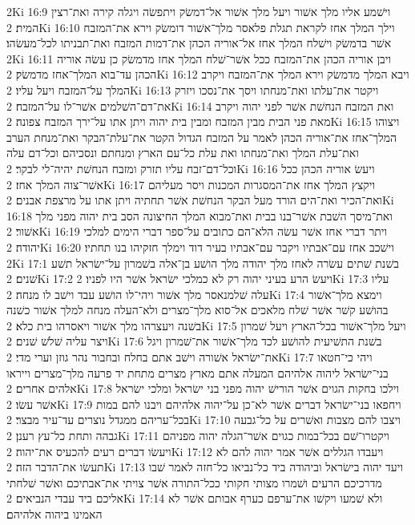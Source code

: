 2Ki 16:9  וישׁמע אליו מלך אשׁור ויעל מלך אשׁור אל־דמשׂק ויתפשׂה ויגלה קירה ואת־רצין המית׃
2Ki 16:10  וילך המלך אחז לקראת תגלת פלאסר מלך־אשׁור דומשׂק וירא את־המזבח אשׁר בדמשׂק וישׁלח המלך אחז אל־אוריה הכהן את־דמות המזבח ואת־תבניתו לכל־מעשׂהו׃
2Ki 16:11  ויבן אוריה הכהן את־המזבח ככל אשׁר־שׁלח המלך אחז מדמשׂק כן עשׂה אוריה הכהן עד־בוא המלך־אחז מדמשׂק׃
2Ki 16:12  ויבא המלך מדמשׂק וירא המלך את־המזבח ויקרב המלך על־המזבח ויעל עליו׃
2Ki 16:13  ויקטר את־עלתו ואת־מנחתו ויסך את־נסכו ויזרק את־דם־השׁלמים אשׁר־לו על־המזבח׃
2Ki 16:14  ואת המזבח הנחשׁת אשׁר לפני יהוה ויקרב מאת פני הבית מבין המזבח ומבין בית יהוה ויתן אתו על־ירך המזבח צפונה׃
2Ki 16:15  ויצוהו המלך־אחז את־אוריה הכהן לאמר על המזבח הגדול הקטר את־עלת־הבקר ואת־מנחת הערב ואת־עלת המלך ואת־מנחתו ואת עלת כל־עם הארץ ומנחתם ונסכיהם וכל־דם עלה וכל־דם־זבח עליו תזרק ומזבח הנחשׁת יהיה־לי לבקר׃
2Ki 16:16  ויעשׂ אוריה הכהן ככל אשׁר־צוה המלך אחז׃
2Ki 16:17  ויקצץ המלך אחז את־המסגרות המכנות ויסר מעליהם ואת־הכיר ואת־הים הורד מעל הבקר הנחשׁת אשׁר תחתיה ויתן אתו על מרצפת אבנים׃
2Ki 16:18  ואת־מיסך השׁבת אשׁר־בנו בבית ואת־מבוא המלך החיצונה הסב בית יהוה מפני מלך אשׁור׃
2Ki 16:19  ויתר דברי אחז אשׁר עשׂה הלא־הם כתובים על־ספר דברי הימים למלכי יהודה׃
2Ki 16:20  וישׁכב אחז עם־אבתיו ויקבר עם־אבתיו בעיר דוד וימלך חזקיהו בנו תחתיו׃
2Ki 17:1  בשׁנת שׁתים עשׂרה לאחז מלך יהודה מלך הושׁע בן־אלה בשׁמרון על־ישׂראל תשׁע שׁנים׃
2Ki 17:2  ויעשׂ הרע בעיני יהוה רק לא כמלכי ישׂראל אשׁר היו לפניו׃
2Ki 17:3  עליו עלה שׁלמנאסר מלך אשׁור ויהי־לו הושׁע עבד וישׁב לו מנחה׃
2Ki 17:4  וימצא מלך־אשׁור בהושׁע קשׁר אשׁר שׁלח מלאכים אל־סוא מלך־מצרים ולא־העלה מנחה למלך אשׁור כשׁנה בשׁנה ויעצרהו מלך אשׁור ויאסרהו בית כלא׃
2Ki 17:5  ויעל מלך־אשׁור בכל־הארץ ויעל שׁמרון ויצר עליה שׁלשׁ שׁנים׃
2Ki 17:6  בשׁנת התשׁיעית להושׁע לכד מלך־אשׁור את־שׁמרון ויגל את־ישׂראל אשׁורה וישׁב אתם בחלח ובחבור נהר גוזן וערי מדי׃
2Ki 17:7  ויהי כי־חטאו בני־ישׂראל ליהוה אלהיהם המעלה אתם מארץ מצרים מתחת יד פרעה מלך־מצרים וייראו אלהים אחרים׃
2Ki 17:8  וילכו בחקות הגוים אשׁר הורישׁ יהוה מפני בני ישׂראל ומלכי ישׂראל אשׁר עשׂו׃
2Ki 17:9  ויחפאו בני־ישׂראל דברים אשׁר לא־כן על־יהוה אלהיהם ויבנו להם במות בכל־עריהם ממגדל נוצרים עד־עיר מבצר׃
2Ki 17:10  ויצבו להם מצבות ואשׁרים על כל־גבעה גבהה ותחת כל־עץ רענן׃
2Ki 17:11  ויקטרו־שׁם בכל־במות כגוים אשׁר־הגלה יהוה מפניהם ויעשׂו דברים רעים להכעיס את־יהוה׃
2Ki 17:12  ויעבדו הגללים אשׁר אמר יהוה להם לא תעשׂו את־הדבר הזה׃
2Ki 17:13  ויעד יהוה בישׂראל וביהודה ביד כל־נביאו כל־חזה לאמר שׁבו מדרכיכם הרעים ושׁמרו מצותי חקותי ככל־התורה אשׁר צויתי את־אבתיכם ואשׁר שׁלחתי אליכם ביד עבדי הנביאים׃
2Ki 17:14  ולא שׁמעו ויקשׁו את־ערפם כערף אבותם אשׁר לא האמינו ביהוה אלהיהם׃
